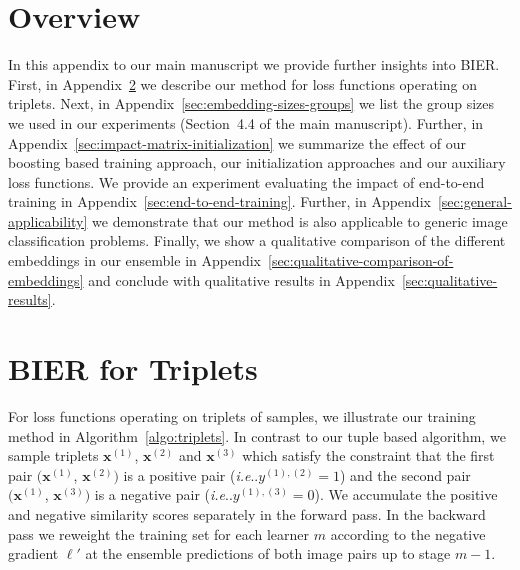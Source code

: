 \documentclass[10pt,journal,compsoc]{IEEEtran}
\makeatletter
\DeclareRobustCommand\onedot{\futurelet\@let@token\@onedot}
\def\@onedot{\ifx\@let@token.\else.\null\fi\xspace}
\def\ie{\emph{i.e}\onedot} \def\Ie{\emph{I.e}\onedot}
\makeatother
\begin{document}
\appendices\section{Overview}\label{sec:introduction}

In this appendix to our main manuscript we provide further insights into \ac{BIER}.  First, in
Appendix~\ref{sec:algorithm} we describe our method for loss functions operating
on triplets. 
Next, in Appendix~\ref{sec:embedding-sizes-groups} we list the group sizes we used in our experiments (Section~4.4 of the main manuscript).
Further, in Appendix~\ref{sec:impact-matrix-initialization} we summarize the effect of
our boosting based training approach, our initialization approaches and our auxiliary loss functions. We
provide an experiment evaluating the impact of end-to-end training in
Appendix~\ref{sec:end-to-end-training}. Further, in
Appendix~\ref{sec:general-applicability} we demonstrate that our method is
also applicable to generic image classification problems.  
Finally, we show a qualitative comparison of the different embeddings 
in our ensemble in Appendix~\ref{sec:qualitative-comparison-of-embeddings} 
and conclude with qualitative results in Appendix~\ref{sec:qualitative-results}.

\section{BIER for Triplets}\label{sec:algorithm}

For loss functions operating on triplets of samples, we illustrate our training method in Algorithm~\ref{algo:triplets}. 
In contrast to our tuple based algorithm, we sample triplets $\boldsymbol{x}^{(1)}$, $\boldsymbol{x}^{(2)}$ 
and $\boldsymbol{x}^{(3)}$ which satisfy the constraint that the first pair $(\boldsymbol{x}^{(1)}$, $\boldsymbol{x}^{(2)})$ 
is a positive pair (\ie$y^{(1),(2)} = 1$) and the 
second pair $(\boldsymbol{x}^{(1)}$, $\boldsymbol{x}^{(3)})$ is a negative pair (\ie$y^{(1),(3)} = 0$).
We accumulate the positive and negative similarity scores separately in the forward pass. 
In the backward pass we reweight the training set for each learner $m$ according to the negative gradient $\ell'$
at the ensemble predictions of both image pairs up to stage $m-1$.
\end{document}
